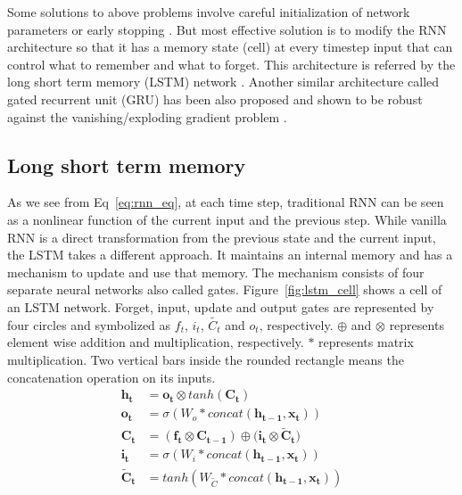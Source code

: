 \documentclass[10pt,twocolumn,letterpaper]{article}
\begin{document}
Some solutions to above problems involve 
careful initialization of network parameters or  early stopping  \cite{DBLP:journals/corr/abs-1211-5063}. But most effective solution is 
to modify the RNN architecture so that it has a memory state (cell) at every timestep input  that can control what to remember and what to forget. This architecture is referred by the 
long short term memory (LSTM) network \cite{Hochreiter:1997:LSM:1246443.1246450}. Another similar architecture called gated recurrent unit (GRU) has been also proposed and shown to be robust
against the 
vanishing/exploding gradient problem \cite{DBLP:journals/corr/ChoMGBSB14}.

\subsection{Long short term memory} \label{lstm_sec}
As we see from Eq~\ref{eq:rnn_eq}, at each time step, traditional RNN can be 
seen as a nonlinear function of the current input and the previous step. While vanilla RNN is a 
direct transformation from the previous state and the current input, the 
LSTM takes a different approach. It maintains an internal memory and  has a 
mechanism to update and use that memory. The mechanism consists of four separate neural networks also 
called gates. Figure~\ref{fig:lstm_cell} shows a cell of an LSTM network.
Forget, input, update and output gates are represented by four circles and symbolized as $f_t$, $i_t$, $\tilde{C_t}$ and $o_t$, respectively. $\oplus$ and $\otimes$ represents element wise addition and multiplication, 
respectively. $*$ represents matrix multiplication. Two vertical bars inside the rounded rectangle means the 
concatenation operation on its inputs. 
\begin{equation}
\label{eq:lstm_eq}
	\begin{aligned}
		\mathbf{h_t} &= \mathbf{o_t} \otimes tanh(\mathbf{C_t}) \\
		\mathbf{o_t} &= \sigma(W_o * concat(\mathbf{h_{t-1}}, \mathbf{x_t})) \\
		\mathbf{C_t} &= (\mathbf{f_t} \otimes \mathbf{C_{t-1}}) \oplus (\mathbf{i_t} \otimes \mathbf{\tilde{C}_t)}  \\
		\mathbf{i_t} &= \sigma(W_i * concat(\mathbf{h_{t-1}}, \mathbf{x_t})) \\
		\mathbf{\tilde{C}_t} &= tanh(W_{\tilde{C}} * concat(\mathbf{h_{t-1}}, \mathbf{x_t}))
	\end{aligned}
\end{equation}
\end{document}

